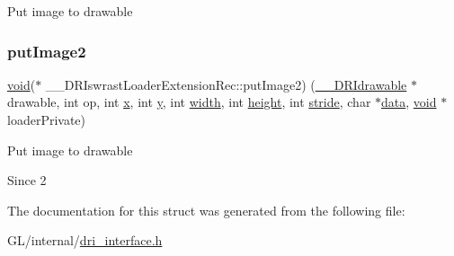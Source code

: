 Put image to drawable \mbox{\label{struct_____d_r_iswrast_loader_extension_rec_ae17582dae5b5cb0b7028da26d9994256}} 
\subsubsection{\texorpdfstring{put\+Image2}{putImage2}}
{\footnotesize\ttfamily \hyperlink{_s_d_l__opengles2__gl2ext_8h_ae5d8fa23ad07c48bb609509eae494c95}{void}($\ast$ \+\_\+\+\_\+\+D\+R\+Iswrast\+Loader\+Extension\+Rec\+::put\+Image2) (\hyperlink{dri__interface_8h_a5bfb832a0a08208d95b3bbef439d2262}{\+\_\+\+\_\+\+D\+R\+Idrawable} $\ast$drawable, int op, int \hyperlink{gl_8h_ad0e63d0edcdbd3d79554076bf309fd47}{x}, int \hyperlink{gl_8h_a1675d9d7bb68e1657ff028643b4037e3}{y}, int \hyperlink{gl_8h_a9a82cf3caff84cabc4598e2619faac17}{width}, int \hyperlink{gl_8h_aa352f2804b9902ac30769c00dde75d5f}{height}, int \hyperlink{glcorearb_8h_a743715bb319dd426e85b9774559cc0ea}{stride}, char $\ast$\hyperlink{gl_8h_a2e335d56e2846b0fea47eed068b2d34a}{data}, \hyperlink{_s_d_l__opengles2__gl2ext_8h_ae5d8fa23ad07c48bb609509eae494c95}{void} $\ast$loader\+Private)}

Put image to drawable

\begin{DoxySince}{Since}
2 
\end{DoxySince}


The documentation for this struct was generated from the following file\+:\begin{DoxyCompactItemize}
\item 
G\+L/internal/\hyperlink{dri__interface_8h}{dri\+\_\+interface.\+h}\end{DoxyCompactItemize}
